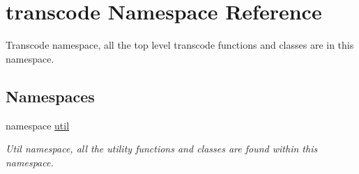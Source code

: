 \hypertarget{namespacetranscode}{
\section{transcode Namespace Reference}
\label{namespacetranscode}
}


Transcode namespace, all the top level transcode functions and classes are in this namespace.  


\subsection*{Namespaces}
\begin{DoxyCompactItemize}
\item 
namespace \hyperlink{namespacetranscode_1_1util}{util}


\begin{DoxyCompactList}\small\item\em Util namespace, all the utility functions and classes are found within this namespace. \item\end{DoxyCompactList}

\end{DoxyCompactItemize}

